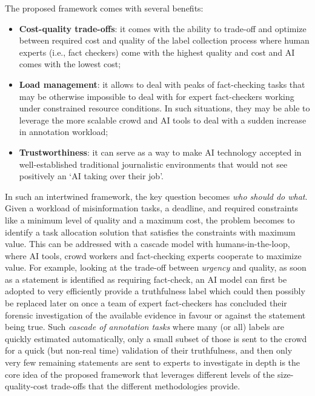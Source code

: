 \documentclass[11pt]{article}
\begin{document}
The proposed framework comes with several benefits:
\begin{itemize}
    \item \textbf{Cost-quality trade-offs}: it comes with the ability to trade-off and optimize between required cost and quality of the label collection process where human experts (i.e., fact checkers) come with the highest quality and cost and AI comes with the lowest cost;
    \item \textbf{Load management}: it allows to deal with peaks of fact-checking tasks that may be otherwise impossible to deal with for expert fact-checkers working under constrained resource conditions. In such situations, they may be able to leverage the more scalable crowd and AI tools to deal with a sudden increase in annotation workload;
    \item \textbf{Trustworthiness}: it can serve as a way to make AI technology accepted in well-established traditional journalistic environments that would not see positively an `AI taking over their job'.
\end{itemize}

In such an intertwined framework, the key question becomes \textit{who should do what}. Given a workload of misinformation tasks, a deadline, and required constraints like a minimum level of quality and a maximum cost, the problem becomes to identify a task allocation solution that satisfies the constraints with maximum value.
This can be addressed with a cascade model \cite{viola2001rapid,weiss2010structured,wang2011cascade} with humans-in-the-loop, where AI tools, crowd workers and fact-checking experts cooperate to maximize value.
% 
For example, looking at the trade-off between \textit{urgency} and quality, as soon as a statement is identified as requiring fact-check, an AI model can first be adopted to very efficiently provide a truthfulness label which could then possibly be replaced later on once a team of expert fact-checkers has concluded their forensic investigation of the available evidence in favour or against the statement being true.
Such \textit{cascade of annotation tasks} where many (or all) labels are quickly estimated automatically, only a small subset of those is sent to the crowd for a quick (but non-real time) validation of their truthfulness, and then only very few remaining statements are sent to experts to investigate in depth is the core idea of the proposed framework that leverages different levels of the size-quality-cost trade-offs that the different methodologies provide.
\end{document}
